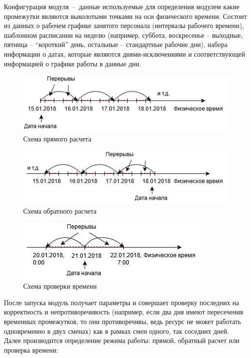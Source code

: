\indent Конфигурация модуля~--~данные используемые для определения модулем какие промежутки являются выколотыми точками на оси физического времени.
Состоит из данных о рабочем графике занятого персонала (интервалы рабочего времени), шаблонном расписании на неделю (например, суббота, воскресенье -- выходные, пятница -- ``короткий'' день, остальные -- стандартные рабочие дни), набора информации о датах, которые являются днями-исключениями и соответствующей информацией о графике работы в данные дни.

\begin{figure}[h!]
	\centering
	\includegraphics[width=0.7\linewidth]{pics/scheduleStraightCalc.png}
	\caption{Схема прямого расчета}
	\label{fig:straightCalc}
\end{figure}
\begin{figure}[h!]
	\centering
	\includegraphics[width=0.7\linewidth]{pics/scheduleReverceCalc.png}
	\caption{Схема обратного расчета}
	\label{fig:reverceCalc}
\end{figure}

\begin{figure}[h!]
	\centering
	\includegraphics[width=0.7\linewidth]{pics/scheduleCheckCalc.png}
	\caption{Схема проверки времени}
	\label{fig:checkCalc}
\end{figure}

\indent После запуска модуль получает параметры и совершает проверку последних на корректность и непротиворечивость (например, если два дня имеют пересечения временных промежутков, то они противоречивы, ведь ресурс не может работать одновременно в двух сменах) как в рамках смен одного, так соседних дней.
Далее производится определение режима работы: прямой, обратный расчет или проверка времени:


